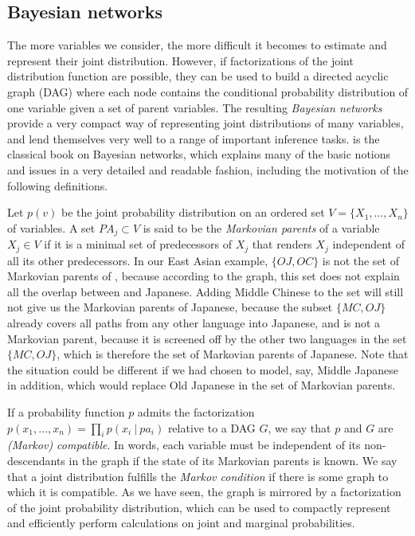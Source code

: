 \largerpage[-1]
\subsection{Bayesian networks}
The more variables we consider, the more difficult it becomes to estimate and represent their joint distribution. However, if factorizations of the joint distribution function are possible, they can be used to build a directed acyclic graph (DAG) where each node contains the conditional probability distribution of one variable given a set of parent variables. The resulting \textit{Bayesian networks} provide a very compact way of representing joint distributions of many variables, and lend themselves very well to a range of important inference tasks. \cite{pearl1988} is the classical book on Bayesian networks, which explains many of the basic notions and issues in a very detailed and readable fashion, including the motivation of the following definitions.

Let $p(v)$ be the joint probability distribution on an ordered set $V = \{X_1,\dots,X_n\}$ of variables. A set $PA_j \subset V$ is said to be the \textit{Markovian parents} of a variable $X_j \in V$ if it is a minimal set of predecessors of $X_j$ that renders $X_j$ independent of all its other predecessors. In our East Asian example, $\{OJ,OC\}$ is not the set of Markovian parents of , because according to the graph, this set does not explain all the overlap between  and Japanese. Adding Middle Chinese to the set will still not give us the Markovian parents of Japanese, because the subset $\{MC,OJ\}$ already covers all paths from any other language into Japanese, and  is not a Markovian parent, because it is screened off by the other two languages in the set $\{MC,OJ\}$, which is therefore the set of Markovian parents of Japanese. Note that the situation could be different if we had chosen to model, say, Middle Japanese in addition, which would replace Old 
Japanese in the set of Markovian parents.

If a probability function $p$ admits the factorization $p(x_1,\dots,x_n) = \prod_i p(x_i\ |\ pa_i)$ relative to a DAG $G$, we say that $p$ and $G$ are \textit{(Markov) compatible}. In words, each variable must be independent of its non-descendants in the graph if the state of its Markovian parents is known. We say that a joint distribution fulfills the \textit{Markov condition} if there is some graph to which it is compatible. As we have seen, the graph is mirrored by a factorization of the joint probability distribution, which can be used to compactly represent and efficiently perform calculations on joint and marginal probabilities.

